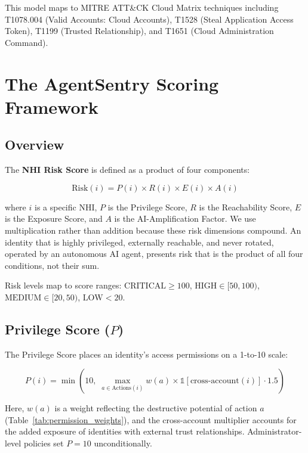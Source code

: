 \documentclass[conference]{IEEEtran}
\begin{document}
This model maps to MITRE ATT\&CK Cloud Matrix techniques including T1078.004
(Valid Accounts: Cloud Accounts), T1528 (Steal Application Access Token),
T1199 (Trusted Relationship), and T1651 (Cloud Administration Command).

\section{The AgentSentry Scoring Framework}

\subsection{Overview}

The \textbf{NHI Risk Score} is defined as a product of four components:

\begin{equation}
  \text{Risk}(i) = P(i) \times R(i) \times E(i) \times A(i)
  \label{eq:risk}
\end{equation}

where $i$ is a specific NHI, $P$ is the Privilege Score, $R$ is the
Reachability Score, $E$ is the Exposure Score, and $A$ is the AI-Amplification
Factor. We use multiplication rather than addition because these risk dimensions
compound. An identity that is highly privileged, externally reachable, and
never rotated, operated by an autonomous AI agent, presents risk that is the
product of all four conditions, not their sum.

Risk levels map to score ranges:
$\text{CRITICAL} \geq 100$,
$\text{HIGH} \in [50, 100)$,
$\text{MEDIUM} \in [20, 50)$,
$\text{LOW} < 20$.

\subsection{Privilege Score ($P$)}

The Privilege Score places an identity's access permissions on a 1-to-10 scale:

\begin{equation}
  P(i) = \min\!\left(10,\; \max_{a \in \text{Actions}(i)} w(a) \times
         \mathbb{1}[\text{cross-account}(i)] \cdot 1.5\right)
  \label{eq:privilege}
\end{equation}

Here, $w(a)$ is a weight reflecting the destructive potential of action $a$
(Table~\ref{tab:permission_weights}), and the cross-account multiplier accounts
for the added exposure of identities with external trust relationships.
Administrator-level policies set $P = 10$ unconditionally.
\end{document}
